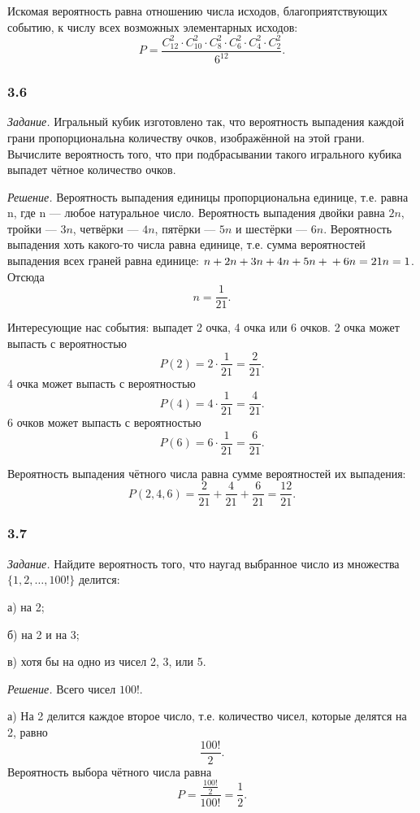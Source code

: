 \documentclass{book}
\begin{document}
Искомая вероятность равна отношению числа исходов, благоприятствующих событию,
к числу всех возможных элементарных исходов:
$$P =
\frac{C_{12}^2 \cdot C_{10}^2 \cdot C_8^2 \cdot C_6^2 \cdot C_4^2 \cdot C_2^2}{6^{12}}.$$

\subsubsection*{3.6}

\textit{Задание.}
Игральный кубик изготовлено так,
что вероятность выпадения каждой грани пропорциональна количеству очков, изображённой на этой грани.
Вычислите вероятность того, что при подбрасывании такого игрального кубика выпадет чётное количество очков.

\textit{Решение.} Вероятность выпадения единицы пропорциональна единице, т.е. равна n, где n --- любое натуральное число.
Вероятность выпадения двойки равна $2 n$, тройки --- $3 n$, четвёрки --- $4 n$, пятёрки --- $5 n$ и шестёрки --- $6 n$.
Вероятность выпадения хоть какого-то числа равна единице, т.е. сумма вероятностей выпадения всех граней равна единице: $n + 2 n + 3 n + 4 n + 5 n + \\ + 6 n = 21 n = 1$.
Отсюда
$$n =
\frac{1}{21}.$$

Интересующие нас события: выпадет 2 очка, 4 очка или 6 очков.
2 очка может выпасть с вероятностью
$$ P \left( 2 \right) =
2 \cdot \frac{1}{21} =
\frac{2}{21}.$$
4 очка может выпасть с вероятностью
$$ P \left( 4 \right) =
4 \cdot \frac{1}{21} =
\frac{4}{21}.$$
6 очков может выпасть с вероятностью
$$ P \left( 6 \right) =
6 \cdot \frac{1}{21} =
\frac{6}{21}.$$

Вероятность выпадения чётного числа равна сумме вероятностей их выпадения:
$$P \left( 2, 4, 6 \right) =
\frac{2}{21} + \frac{4}{21} + \frac{6}{21} =
\frac{12}{21}.$$

\subsubsection*{3.7}

\textit{Задание.} Найдите вероятность того, что наугад выбранное число из множества $\{ 1, 2, \dotsc, 100!\}$ делится:

а) на 2;

б) на 2 и на 3;

в) хотя бы на одно из чисел 2, 3, или 5.

\textit{Решение.} Всего чисел $100!$.

а) На 2 делится каждое второе число, т.е. количество чисел, которые делятся на 2, равно
$$\frac{100!}{2}.$$
Вероятность выбора чётного числа равна
$$P =
\frac{ \frac{100!}{2} }{100!} =
\frac{1}{2}.$$
\end{document}
